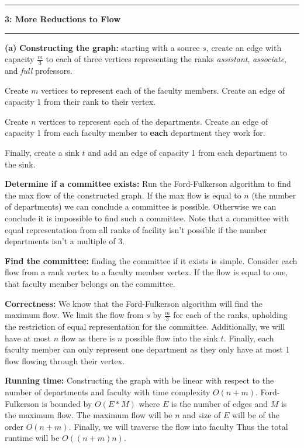 \documentclass[11pt]{article}
\newcommand\question[2]{\vspace{.25in}\hrule\textbf{#1: #2}\vspace{.5em}\hrule\vspace{.10in}}
\renewcommand\part[1]{\vspace{.10in}\textbf{(#1)}}
\newcommand\correctness{\vspace{.10in}\textbf{Correctness: }}
\newcommand\runtime{\vspace{.10in}\textbf{Running time: }}
\begin{document}
\question{3}{More Reductions to Flow}

\part{a} \textbf{Constructing the graph:} starting with a source $s$, create an edge with capacity $\frac{m}{3}$ to each of three vertices representing the ranks \textit{assistant}, \textit{associate}, and \textit{full} professors. 

Create $m$ vertices to represent each of the faculty members. Create an edge of capacity 1 from their rank to their vertex.

Create $n$ vertices to represent each of the departments. Create an edge of capacity 1 from each faculty member to \textbf{each} department they work for.

Finally, create a sink $t$ and add an edge of capacity 1 from each department to the sink.

\textbf{Determine if a committee exists:} Run the Ford-Fulkerson algorithm to find the max flow of the constructed graph. If the max flow is equal to $n$ (the number of departments) we can conclude a committee is possible. Otherwise we can conclude it is impossible to find such a committee. Note that a committee with equal representation from all ranks of facility isn't possible if the number departments isn't a multiple of 3.

\textbf{Find the committee:} finding the committee if it exists is simple. Consider each flow from a rank vertex to a faculty member vertex. If the flow is equal to one, that faculty member belongs on the committee.

\correctness We know that the Ford-Fulkerson algorithm will find the maximum flow. We limit the flow from $s$ by $\frac{m}{3}$ for each of the ranks, upholding the restriction of equal representation for the committee. Additionally, we will have at most $n$ flow as there is $n$ possible flow into the sink $t$. Finally, each faculty member can only represent one department as they only have at most 1 flow flowing through their vertex.

\runtime Constructing the graph with be linear with respect to the number of departments and faculty with time complexity $O(n + m)$. Ford-Fulkerson is bounded by $O(E * M)$ where $E$ is the number of edges and $M$ is the maximum flow. The maximum flow will be $n$ and size of $E$ will be of the order $O(n + m)$. Finally, we will traverse the flow into faculty  Thus the total runtime will be $O((n + m)n)$.
\end{document}
